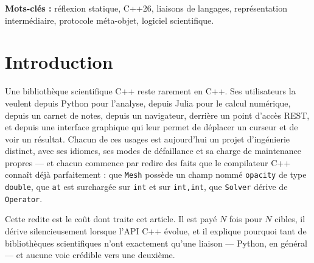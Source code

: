 \documentclass[11pt,a4paper]{article}
\newcommand{\rosetta}{\textsc{Rosetta}}
\newcommand{\code}[1]{\texttt{\small #1}}
\begin{document}
\begin{abstract}
\rosetta{} traite en outre la couverture de liaison comme un artefact de premier
plan : tout membre non exposé est consigné, avec une raison exploitable par
outil, dans un \code{coverage.json} que l'on peut comparer d'une révision à
l'autre. Sur une API contrôlée de 288 méthodes, les cinq cibles indexées par nom
en lient 96 quel que soit le nombre de surcharges déclarées, tandis que la
projection à liaison tardive les atteint toutes les 288 --- deux tiers de
l'interface récupérés par le seul report de la résolution. Pointé sur une
bibliothèque de maillages tierce non modifiée et chargé de lier l'intégralité de
son espace de noms public sans assistance, le pipeline atteint 75\,\% de ce
qu'on lui donne, et la raison de l'échec du reste est concentrée plutôt que
diffuse : un quart de la surface déclarée de cette bibliothèque est constitué de
patrons, et 85\,\% de ceux-ci se trouvent dans ses types-valeurs vecteur et
matrice plutôt que dans les algorithmes qu'un appelant invoque.
\end{abstract}

\noindent\textbf{Mots-clés :} réflexion statique, C++26, liaisons de langages,
représentation intermédiaire, protocole méta-objet, logiciel scientifique.

\section{Introduction}
\label{sec:intro}

Une bibliothèque scientifique C++ reste rarement en C++. Ses utilisateurs la
veulent depuis Python pour l'analyse, depuis Julia pour le calcul numérique,
depuis un carnet de notes, depuis un navigateur, derrière un point d'accès REST,
et depuis une interface graphique qui leur permet de déplacer un curseur et de
voir un résultat. Chacun de ces usages est aujourd'hui un projet d'ingénierie
distinct, avec ses idiomes, ses modes de défaillance et sa charge de maintenance
propres --- et chacun commence par redire des faits que le compilateur C++
connaît déjà parfaitement : que \code{Mesh} possède un champ nommé
\code{opacity} de type \code{double}, que \code{at} est surchargée sur
\code{int} et sur \code{int,int}, que \code{Solver} dérive de \code{Operator}.

Cette redite est le coût dont traite cet article. Il est payé $N$ fois pour $N$
cibles, il dérive silencieusement lorsque l'API C++ évolue, et il explique
pourquoi tant de bibliothèques scientifiques n'ont exactement qu'une liaison ---
Python, en général --- et aucune voie crédible vers une deuxième.
\end{document}
